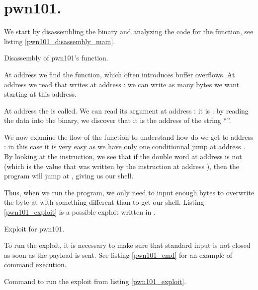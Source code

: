 \section{pwn101.}
\par We start by disassembling the binary and analyzing the code for the  function, see listing \ref{pwn101_disassembly_main}.
\begin{listing}
	
	\caption{Disassembly of pwn101's  function.}
	\label{pwn101_disassembly_main}
\end{listing}
\par At address  we find the  function, which often introduces buffer overflows. At address  we read that  writes at address : we can write as many bytes we want starting at this address.
\par At address  the  is called. We can read its argument at address : it is : by reading the data into the binary, we discover that it is the address of the string ``''.
\par We now examine the flow of the  function to understand how do we get to address :  in this case it is very easy as we have only one conditionnal jump at address . By looking at the  instruction, we see that if the double word at address  is not  (which is the value that was written by the instruction at address ), then the program will jump at , giving us our shell.
\par Thus, when we run the program, we only need to input enough bytes to overwrite the byte at  with something different than  to get our shell. Listing \ref{pwn101_exploit} is a possible exploit written in .
\begin{listing}
	\caption{Exploit for pwn101.}
	\label{pwn101_exploit}
\end{listing}
\par To run the exploit, it is necessary to make sure that standard input is not closed as soon as the payload is sent. See listing \ref{pwn101_cmd} for an example of command execution.
\begin{listing}
	\caption{Command to run the exploit from listing \ref{pwn101_exploit}.}
	\label{pwn101_cmd}
\end{listing}
